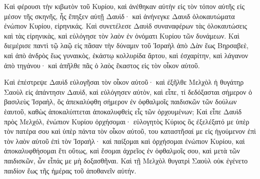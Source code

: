 {\par }{\PP {}Καὶ φέρουσι τὴν κιβωτὸν τοῦ Κυρίου, καὶ ἀνέθηκαν αὐτὴν εἰς τὸν τόπον αὐτῆς εἰς μέσον τῆς σκηνῆς, ἧς ἔπηξεν αὐτῇ Δαυὶδ· καὶ ἀνήνεγκε Δαυιδ ὁλοκαυτώματα ἐνώπιον Κυρίου, εἰρηνικάς.
Καὶ συνετέλεσε Δαυὶδ συναναφέρων τὰς ὁλοκαυτώσεις καὶ τὰς εἰρηνικὰς, καὶ εὐλόγησε τὸν λαὸν ἐν ὀνόματι Κυρίου τῶν δυνάμεων.
Καὶ διεμέρισε παντὶ τῷ λαῷ εἰς πᾶσαν τὴν δύναμιν τοῦ Ἰσραὴλ ἀπὸ Δὰν ἕως Βηρσαβεὲ, καὶ ἀπὸ ἀνδρὸς ἕως γυναικὸς, ἑκάστῳ κολλυρίδα ἄρτου, καὶ ἐσχαρίτην, καὶ λάγανον ἀπὸ τηγάνου· καὶ ἀπῆλθε πᾶς ὁ λαὸς ἕκαστος εἰς τὸν οἶκον αὐτοῦ.
\par }{\PP {}Καὶ ἐπέστρεψε Δαυὶδ εὐλογῆσαι τὸν οἶκον αὐτοῦ· καὶ ἐξῆλθε Μελχὸλ ἡ θυγάτηρ Σαοὺλ εἰς ἀπάντησιν Δαυὶδ, καὶ εὐλόγησεν αὐτὸν, καὶ εἶπε, τί δεδόξασται σήμερον ὁ βασιλεὺς Ἰσραὴλ, ὃς ἀπεκαλύφθη σήμερον ἐν ὀφθαλμοῖς παιδισκῶν τῶν δούλων ἑαυτοῦ, καθὼς ἀποκαλύπτεται ἀποκαλυφθεὶς εἷς τῶν ὀρχουμένων;
Καὶ εἶπε Δαυὶδ πρὸς Μελχόλ, ἐνώπιον Κυρίου ὀρχήσομαι· εὐλογητὸς Κύριος ὃς ἐξελέξατό με ὑπὲρ τὸν πατέρα σου καὶ ὑπὲρ πάντα τὸν οἶκον αὐτοῦ, του καταστῆσαί με εἰς ἡγούμενον ἐπὶ τὸν λαὸν αὐτοῦ ἐπὶ τὸν Ἰσραὴλ·
καὶ παίξομαι καὶ ὀρχήσομαι ἐνώπιον Κυρίου, καὶ ἀποκαλυφθήσομαι ἔτι οὕτως, καὶ ἔσομαι ἀχρεῖος ἐν ὀφθαλμοῖς σου, καὶ μετὰ τῶν παιδισκῶν, ὧν εἶπάς με μὴ δοξασθῆναι.
Καὶ τῇ Μελχὸλ θυγατρὶ Σαοὺλ οὐκ ἐγένετο παιδίον ἕως τῆς ἡμέρας τοῦ ἀποθανεῖν αὐτήν.

}
